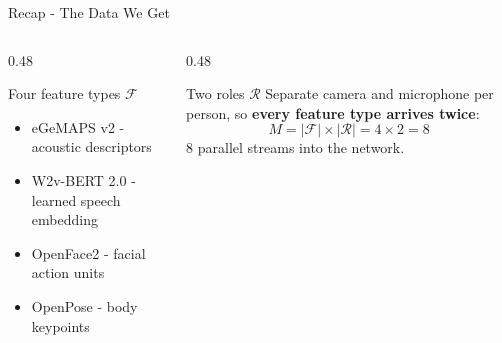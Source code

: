 \documentclass[aspectratio=169]{beamer}
\begin{document}
	\begin{frame}{Recap - The Data We Get}
		\begin{columns}[onlytextwidth]
			\begin{column}{0.48\textwidth}
				\begin{block}{Four feature types $\mathcal{F}$}
					\small
					\begin{itemize}
						\item eGeMAPS v2 - acoustic descriptors
						\item W2v-BERT 2.0 - learned speech embedding
						\item OpenFace2 - facial action units
						\item OpenPose - body keypoints
					\end{itemize}
				\end{block}
			\end{column}
			\begin{column}{0.48\textwidth}
				\begin{block}{Two roles $\mathcal{R}$}
					\small
					Separate camera and microphone per person, so \textbf{every feature type
					arrives twice}:
					$$ M = |\mathcal{F}| \times |\mathcal{R}| = 4 \times 2 = 8 $$
					8 parallel streams into the network.
				\end{block}
			\end{column}
		\end{columns}
		\vspace{0.5em}
		\begin{center}
		\end{center}
	\end{frame}
\end{document}

